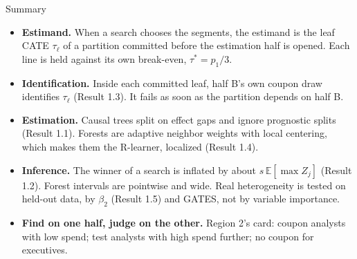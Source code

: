 \documentclass[aspectratio=169, 11pt, handout]{beamer}
\newcommand{\E}{\mathbb{E}}
\newcommand{\spinestep}[1]{\textcolor{sbgreen}{\textbf{#1}}}
\begin{document}
\begin{frame}{Summary}

\begin{itemize}
  \item \spinestep{Estimand.} When a search chooses the segments, the estimand is the leaf CATE $\tau_\ell$ of a partition committed before the estimation half is opened. Each line is held against its own break-even, $\tau^\ast = p_1/3$.
  \item \spinestep{Identification.} Inside each committed leaf, half B's own coupon draw identifies $\tau_\ell$ (Result 1.3). It fails as soon as the partition depends on half B.
  \item \spinestep{Estimation.} Causal trees split on effect gaps and ignore prognostic splits (Result 1.1). Forests are adaptive neighbor weights with local centering, which makes them the R-learner, localized (Result 1.4).
  \item \spinestep{Inference.} The winner of a search is inflated by about $s\,\E[\max Z_j]$ (Result 1.2). Forest intervals are pointwise and wide. Real heterogeneity is tested on held-out data, by $\beta_2$ (Result 1.5) and GATES, not by variable importance.
  \item \textbf{Find on one half, judge on the other.} Region 2's card: coupon analysts with low spend; test analysts with high spend further; no coupon for executives.
\end{itemize}
\end{frame}
\end{document}

